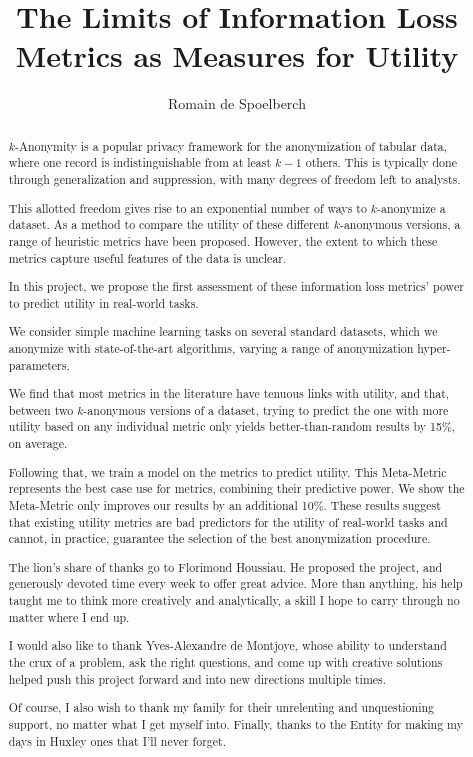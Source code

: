 \documentclass[a4paper, twoside]{report}
\title{The Limits of Information Loss Metrics as Measures for Utility}
\author{Romain de Spoelberch}
\theoremstyle{definition}
\begin{document}


\begin{abstract}
$k$-Anonymity is a popular privacy framework for the anonymization of tabular data, where one record is indistinguishable from at least $k-1$ others. This is typically done through generalization and suppression, with many degrees of freedom left to analysts. 

This allotted freedom gives rise to an exponential number of ways to $k$-anonymize a dataset. As a method to compare the utility of these different $k$-anonymous versions, a range of heuristic metrics have been proposed. However, the extent to which these metrics capture useful features of the data is unclear.

In this project, we propose the first assessment of these information loss metrics' power to predict utility in real-world tasks.

We consider simple machine learning tasks on several standard datasets, which we anonymize with state-of-the-art algorithms, varying a range of anonymization hyper-parameters.

We find that most metrics in the literature have tenuous links with utility, and that, between two $k$-anonymous versions of a dataset, trying to predict the one with more utility based on any individual metric only yields better-than-random results by 15\%, on average.

Following that, we train a model on the metrics to predict utility. This Meta-Metric represents the best case use for metrics, combining their predictive power. We show the Meta-Metric only improves our results by an additional 10\%. 
These results suggest that existing utility metrics are bad predictors for the utility of real-world tasks and cannot, in practice, guarantee the selection of the best anonymization procedure.
\end{abstract}

\renewcommand{\abstractname}{Acknowledgements}
\begin{abstract}
The lion's share of thanks go to Florimond Houssiau. He proposed the project, and generously devoted time every week to offer great advice. More than anything, his help taught me to think more creatively and analytically, a skill I hope to carry through no matter where I end up.

I would also like to thank Yves-Alexandre de Montjoye, whose ability to understand the crux of a problem, ask the right questions, and come up with creative solutions helped push this project forward and into new directions multiple times.

Of course, I also wish to thank my family for their unrelenting and unquestioning support, no matter what I get myself into. Finally, thanks to the Entity for making my days in Huxley ones that I'll never forget. 
\end{abstract}
\end{document}
